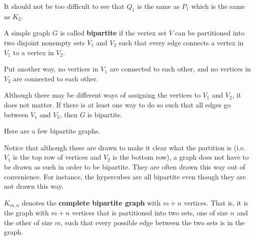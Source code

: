 %

It should not be too difficult to see that $Q_1$ is the same as $P_1$ which is the same as $K_2$.

\begin{df}
A simple graph $G$ is called {\bf bipartite} if
the vertex set $V$ can be partitioned into two disjoint nonempty sets $V_1$ and $V_2$
such that every edge connects a vertex in $V_1$ to a vertex in $V_2$.

Put another way, no vertices in $V_1$ are connected to each other, 
and no vertices in $V_2$ are connected to each other.
\end{df} 

Although there may be different ways of assigning the
vertices to $V_1$ and $V_2$, it does not matter.  
If there is at least one way to do so such that 
all edges go between $V_1$ and $V_2$, then $G$ is bipartite.

\begin{exa}\label{exa:bipart}
Here are a few bipartite graphs.  
\begin{center}
\end{center}Notice that although these are drawn to make it clear
what the partition is (i.e. $V_1$ is the top row of vertices and $V_2$ is the bottom row),
a graph does not have to be drawn as such in order to be bipartite.  
They are often drawn this way out of convenience.
For instance, the hypercubes are all bipartite even though they are not drawn this way.
\end{exa}

\begin{df}
$K_{m,n}$ denotes the {\bf complete bipartite graph} with $m+n$
vertices. That is, it is the graph with $m+n$ vertices that is partitioned into two sets, 
one of size $n$ and the other of size $m$, such that every possible edge between the two sets is in the graph.
\end{df}

